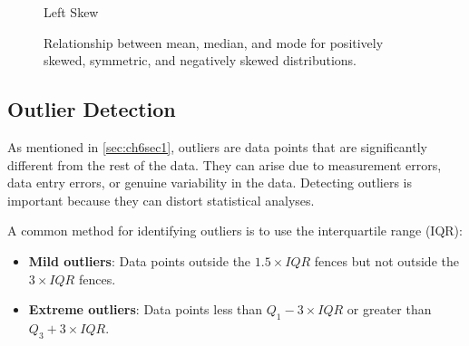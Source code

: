 \begin{figure}[htbp]
\begin{minipage}{0.32\textwidth}
    \end{minipage}
    \hfill
    \begin{minipage}{0.32\textwidth}
        \centering
        \par\small Left Skew
    \end{minipage}
    \caption{Relationship between mean, median, and mode for positively skewed, symmetric, and negatively skewed distributions.}
    \label{fig:skew_mean_median_mode}
\end{figure}

\subsection*{Outlier Detection}

As mentioned in \autoref{sec:ch6sec1}, outliers are data points that are significantly different from the rest of the data. They can arise due to measurement errors, data entry errors, or genuine variability in the data. Detecting outliers is important because they can distort statistical analyses.

A common method for identifying outliers is to use the interquartile range (IQR):

\begin{itemize}
    \item \textbf{Mild outliers}: Data points outside the $1.5\times IQR$ fences but not outside the $3\times IQR$ fences.
    \item \textbf{Extreme outliers}: Data points less than $Q_1 - 3 \times IQR$ or greater than $Q_3 + 3 \times IQR$.
\end{itemize}


